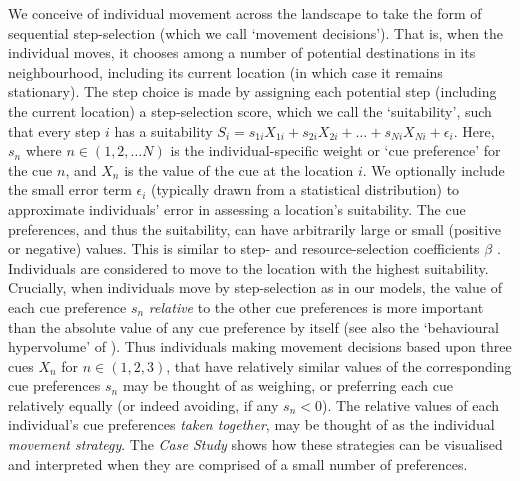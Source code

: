 We conceive of individual movement across the landscape to take the form of sequential step-selection (which we call `movement decisions').
That is, when the individual moves, it chooses among a number of potential destinations in its neighbourhood, including its current location (in which case it remains stationary).
The step choice is made by assigning each potential step (including the current location) a step-selection score, which we call the `suitability', such that every step $i$ has a suitability $S_i = s_{1i}X_{1i} + s_{2i}X_{2i} + \ldots + s_{Ni}X_{Ni} + \epsilon_i$.
Here, $s_n$ where $n \in (1, 2, \ldots N)$ is the individual-specific weight or `cue preference' for the cue $n$, and $X_n$ is the value of the cue at the location $i$.
We optionally include the small error term $\epsilon_i$ (typically drawn from a statistical distribution) to approximate individuals' error in assessing a location's suitability.
The cue preferences, and thus the suitability, can have arbitrarily large or small (positive or negative) values.
This is similar to step- and resource-selection coefficients $\beta$ \parencite[see Box 2][]{fortin2005,manly2002}.
Individuals are considered to move to the location with the highest suitability.
Crucially, when individuals move by step-selection as in our models, the value of each cue preference $s_{n}$ \textit{relative} to the other cue preferences is more important than the absolute value of any cue preference by itself (see also the `behavioural hypervolume' of \cite{bastille-rousseau2019}).
Thus individuals making movement decisions based upon three cues $X_n$ for $n \in (1, 2, 3)$, that have relatively similar values of the corresponding cue preferences $s_n$ may be thought of as weighing, or preferring each cue relatively equally (or indeed avoiding, if any $s_n < 0$).
The relative values of each individual's cue preferences \textit{taken together}, may be thought of as the individual \textit{movement strategy}.
The \emph{Case Study} shows how these strategies can be visualised and interpreted when they are comprised of a small number of preferences.

